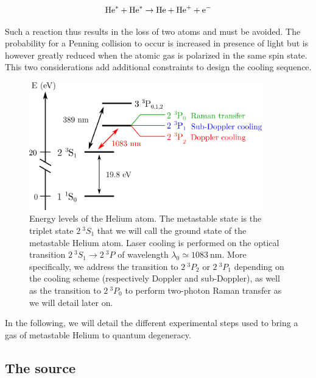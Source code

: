 \begin{equation}
    \mathrm{He}^* + \mathrm{He}^* \rightarrow \mathrm{He} + \mathrm{He}^+ + \mathrm{e}^{-}
\end{equation}

\noindent Such a reaction thus results in the loss of two atoms and must be avoided. The probability for a Penning collision to occur is increased in presence of light \cite{bardou1992magneto} but is however greatly reduced when the atomic gas is polarized in the same spin state. This two considerations add additional constraints to design the cooling sequence.




\begin{figure}
    \centering
    \includegraphics[width=0.9\textwidth]{Fig/Chapter3/niveaux.png}
    \caption{Energy levels of the Helium atom. The metastable state is the triplet state $2 \ ^3S_1$ that we will call the ground state of the metastable Helium atom. Laser cooling is performed on the optical transition $2 \ ^3S_1 \rightarrow 2 \ ^3 P$ of wavelength $\lambda_0 \simeq 1083 \ \mathrm{nm}$. More specifically, we address the transition to  $2 \ ^3 P_2$ or $2 \ ^3 P_1$ depending on the cooling scheme (respectively Doppler and sub-Doppler), as well as the transition to  $2 \ ^3 P_0$ to perform two-photon Raman transfer as we will detail later on.}
    \label{fig:niveaux}
\end{figure}

In the following, we will detail the different experimental steps used to bring a gas of metastable Helium to quantum degeneracy.


\subsection{The source}

